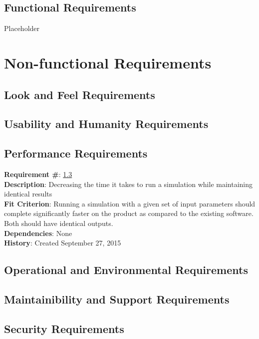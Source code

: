 \documentclass[12pt]{article}
\begin{document}
\subsection{Functional Requirements} %
Placeholder

\section{Non-functional Requirements}
\subsection{Look and Feel Requirements} %
\subsection{Usability and Humanity Requirements} %

\subsection{Performance Requirements}\label{Req_Performance}

\textbf{Requirement \#}: \ref{Req_Performance}\\

\textbf{Description}: Decreasing the time it takes to run a simulation while maintaining identical results\\

\textbf{Fit Criterion}: Running a simulation with a given set of input parameters should complete significantly faster on the product as compared to the existing software. Both should have identical outputs.\\

\textbf{Dependencies}: None\\

\textbf{History}: Created September 27, 2015

\subsection{Operational and Environmental Requirements} %
\subsection{Maintainibility and Support Requirements} %
\subsection{Security Requirements} %
\end{document}
